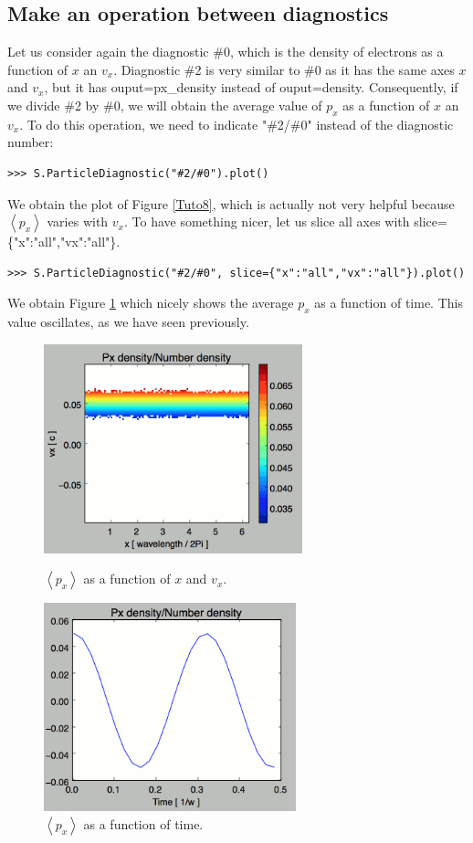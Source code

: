 \documentclass[11pt]{article}
\newcommand{\code}[1]{\colorbox{yellow!15}{\ttfamily #1}}
\begin{document}
\subsection{Make an operation between diagnostics}
Let us consider again the diagnostic \#0, which is the density of electrons as a function of $x$ an $v_x$. Diagnostic \#2 is very similar to \#0 as it has the same axes $x$ and $v_x$, but it has \code{ouput=px\_density} instead of \code{ouput=density}. Consequently, if we divide \#2 by \#0, we will obtain the average value of $p_x$ as a function of $x$ an $v_x$. To do this operation, we need to indicate \code{"\#2/\#0"} instead of the diagnostic number:
\begin{lstlisting}
>>> S.ParticleDiagnostic("#2/#0").plot()
\end{lstlisting}
We obtain the plot of Figure \ref{Tuto8}, which is actually not very helpful because $\left<p_x\right>$ varies with $v_x$. To have something nicer, let us slice all axes with \code{slice=\{"x":"all","vx":"all"\}}.
\begin{lstlisting}
>>> S.ParticleDiagnostic("#2/#0", slice={"x":"all","vx":"all"}).plot()
\end{lstlisting}
We obtain Figure \ref{Tuto9} which nicely shows the average $p_x$ as a function of time. This value oscillates, as we have seen previously.


\begin{figure}[htbp]
\centering
\begin{minipage}[b]{.48\linewidth}
\includegraphics[width=7.5cm]{ParticleDiagTutorial8}
\caption{$\left<p_x\right>$ as a function of $x$ and $v_x$.}
\label{Tuto8}
\end{minipage}
\hfill{}
\begin{minipage}[b]{.48\linewidth}
\includegraphics[width=7.3cm]{ParticleDiagTutorial9}
\caption{$\left<p_x\right>$ as a function of time.}
\label{Tuto9}
\end{minipage}
\end{figure}
\end{document}
